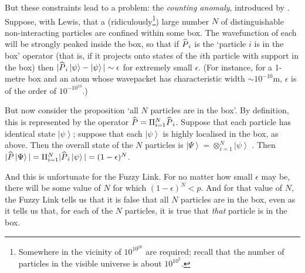\documentclass[12pt]{article}
\newcommand{\ket}[1]{\ensuremath{\left|  #1 \right\rangle}}
\newcommand{\op}[1]{\ensuremath{\widehat{\textsf{\ensuremath{#1}}}}}
\begin{document}
But these constraints lead to a problem: the \emph{counting anomaly}, introduced by  . Suppose, with Lewis, that a (ridiculously\footnote{Somewhere in the vicinity of $10^{10^{20}}$ are required; recall that the number of particles in the visible universe is about $10^{10^2}.$}) large number $N$ of distinguishable non-interacting particles are confined within some box. The wavefunction of each will be strongly peaked inside the box, so that if $\op{P}_i$ is the `particle $i$ is in the box' operator (that is, if it projects onto states of the $i$th particle with support in the box) then $|\op{P}_i\ket{\psi}-\ket{\psi}|\sim\epsilon$ for extremely small $\epsilon$. (For instance, for a 1-metre box and an atom whose wavepacket has characteristic width $\sim 10^{-10}\mathrm{m}$, $\epsilon$ is of the order of $10^{-10^{10}}$.) 

But now consider the proposition `all $N$ particles are in the box'. By definition, this is represented by the operator $\op{P}=\Pi_{i=1}^N\op{P}_i$. Suppose that each particle has identical state \ket{\psi}; suppose that each \ket{\psi} is highly localised in the box, as above. Then the overall state of the $N$ particles is $\ket{\Psi}=\otimes_{i=1}^N\ket{\psi}$ . Then $|\op{P}\ket{\Psi}|=\Pi_{i=1}^N |\op{P}_i\ket{\psi}|=(1-\epsilon)^N$. 

And this is unfortunate for the Fuzzy Link. For no matter how small $\epsilon$ may be, there will be some value of $N$ for which $(1-\epsilon)^N<p$. And for that value of $N$, the Fuzzy Link tells us that it is false that all $N$ particles are in the box, even as it tells us that, for each of the $N$ particles, it is true that \emph{that} particle is in the box.
\end{document}
